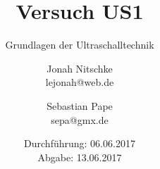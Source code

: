 

\title{Versuch US1}
\subtitle{Grundlagen der Ultraschalltechnik}
\author{Jonah Nitschke\\
        lejonah@web.de \and
        Sebastian Pape\\
        sepa@gmx.de}
\date{Durchführung: 06.06.2017\\
      Abgabe: 13.06.2017}



\maketitle
\newpage
\setcounter{page}{1}


\newpage


\printbibliography



